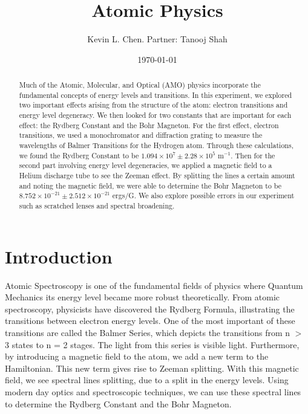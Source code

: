 \title{Atomic Physics}
\author         {Kevin L. Chen. Partner: Tanooj Shah}
\date{\today}

\begin{abstract}
Much of the Atomic, Molecular, and Optical (AMO) physics incorporate the fundamental concepts of energy levels and transitions. In this experiment, we explored two important effects arising from the structure of the atom: electron transitions and energy level degeneracy. We then looked for two constants that are important for each effect: the Rydberg Constant and the Bohr Magneton. For the first effect, electron transitions, we used a monochromator and diffraction grating to measure the wavelengths of Balmer Transitions for the Hydrogen atom. Through these calculations, we found the Rydberg Constant to be $1.094 \times 10^{7} \pm 2.28 \times 10^{5} $ m$^{-1}$. Then for the second part involving energy level degeneracies, we applied a magnetic field to a Helium discharge tube to see the Zeeman effect. By splitting the lines a certain amount and noting the magnetic field, we were able to determine the Bohr Magneton to be $8.752 \times 10^{-21} \pm 2.512 \times 10^{-21}$ ergs/G. We also explore possible errors in our experiment such as scratched lenses and spectral broadening.
\end{abstract}

\maketitle

\section*{Introduction}

Atomic Spectroscopy is one of the fundamental fields of physics where Quantum Mechanics its energy level became more robust theoretically. From atomic spectroscopy, physicists have discovered the Rydberg Formula, illustrating the transitions between electron energy levels. One of the most important of these transitions are called the Balmer Series, which depicts the transitions from n $>$ 3 states to n = 2 stages. The light from this series is visible light. Furthermore, by introducing a magnetic field to the atom, we add a new term to the Hamiltonian. This new term gives rise to Zeeman splitting. With this magnetic field, we see spectral lines splitting, due to a split in the energy levels. Using modern day optics and spectroscopic techniques, we can use these spectral lines to determine the Rydberg Constant and the Bohr Magneton. 
